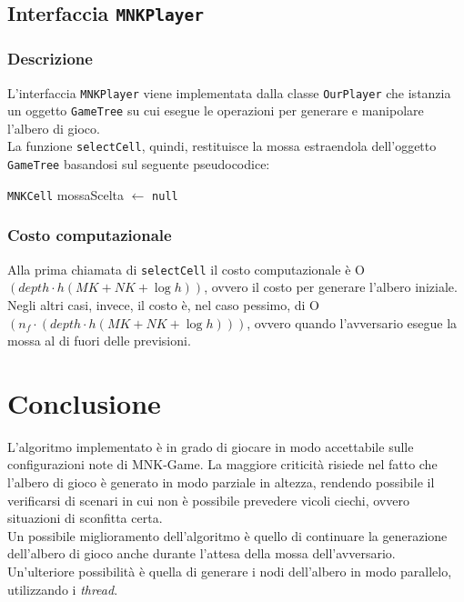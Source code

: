 \documentclass[11pt]{article}
\begin{document}
\newpage
\subsection*{Interfaccia \texttt{MNKPlayer}}
\subsubsection*{Descrizione}
L'interfaccia \texttt{MNKPlayer} viene implementata dalla classe \texttt{OurPlayer} che istanzia un oggetto \texttt{GameTree} su cui esegue le operazioni per generare e manipolare l'albero di gioco.\\
La funzione \texttt{selectCell}, quindi, restituisce la mossa estraendola dell'oggetto \texttt{GameTree} basandosi sul seguente pseudocodice:
\begin{algorithm*}
\SetAlgoLined
\texttt{MNKCell} mossaScelta $\gets$ \texttt{null}\\
\vspace{0.2cm}
\end{algorithm*}
\subsubsection*{Costo computazionale}
Alla prima chiamata di \texttt{selectCell} il costo computazionale è O$(depth \cdot h(MK+NK+\log h))$, ovvero il costo per generare l'albero iniziale. Negli altri casi, invece, il costo è, nel caso pessimo, di O$(n_f\cdot(depth \cdot h(MK+NK+\log h)))$, ovvero quando l'avversario esegue la mossa al di fuori delle previsioni.

\section*{Conclusione}
L'algoritmo implementato è in grado di giocare in modo accettabile sulle configurazioni note di MNK-Game. La maggiore criticità risiede nel fatto che l'albero di gioco è generato in modo parziale in altezza, rendendo possibile il verificarsi di scenari in cui non è possibile prevedere vicoli ciechi, ovvero situazioni di sconfitta certa.\\
Un possibile miglioramento dell'algoritmo è quello di continuare la generazione dell'albero di gioco anche durante l'attesa della mossa dell'avversario.\\
Un'ulteriore possibilità è quella di generare i nodi dell'albero in modo parallelo, utilizzando i \textit{thread}.
\end{document}

